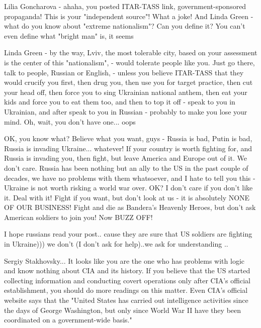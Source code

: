 \begin{itemize}
\begin{itemize}

Lilia Goncharova - ahaha, you posted ITAR-TASS link, government-sponsored
propaganda! This is your "independent source"! What a joke! And Linda Green -
what do you know about "extreme nationalism"? Can you define it? You can't even
define what "bright man" is, it seems


Linda Green - by the way, Lviv, the most tolerable city, based on your
assessment is the center of this "nationalism", - would tolerate people like
you. Just go there, talk to people, Russian or English, - unless you believe
ITAR-TASS that they would crucify you first, then drug you, then use you for
target practice, then cut your head off, then force you to sing Ukrainian
national anthem, then eat your kids and force you to eat them too, and then to
top it off - speak to you in Ukrainian, and after speak to you in Russian -
probably to make you lose your mind. Oh, wait, you don't have one... oops


OK, you know what? Believe what you want, guys - Russia is bad, Putin is bad,
Russia is invading Ukraine... whatever! If your country is worth fighting for,
and Russia is invading you, then fight, but leave America and Europe out of it.
We don't care. Russia has been nothing but an ally to the US in the past couple
of decades, we have no problems with them whatsoever, and I hate to tell you
this - Ukraine is not worth risking a world war over. OK? I don't care if you
don't like it. Deal with it! Fight if you want, but don't look at us - it is
absolutely NONE OF OUR BUSINESS! Fight and die as Bandera's Heavenly Heroes,
but don't ask American soldiers to join you! Now BUZZ OFF!


I hope russians read your post.. cause they are sure that US soldiers are
fighting in Ukraine))) we don't (I don't ask for help)..we ask for
understanding ..


Sergiy Stakhovsky... It looks like you are the one who has problems with logic
and know nothing about CIA and its history. If you believe that the US started
collecting information and conducting covert operations only after CIA's
official establishment, you should do more readings on this matter. Even CIA's
official website says that the "United States has carried out intelligence
activities since the days of George Washington, but only since World War II
have they been coordinated on a government-wide basis."


\end{itemize}
\end{itemize}
